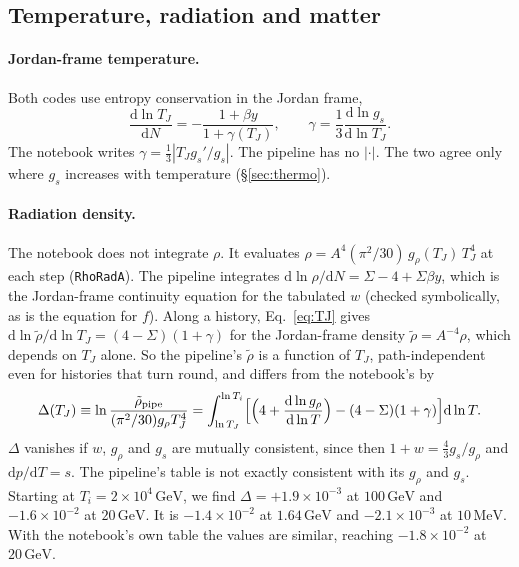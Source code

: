 \documentclass[11pt,a4paper]{article}
\newcommand{\TJ}{T_{J}}
\newcommand{\GeV}{\,\mathrm{GeV}}
\newcommand{\code}[1]{\texttt{#1}}
\begin{document}
\subsection{Temperature, radiation and matter}

\paragraph{Jordan-frame temperature.} Both codes use entropy conservation in the Jordan frame,
\begin{equation}
  \frac{\mathrm{d}\ln\TJ}{\mathrm{d}N} = -\frac{1+\beta y}{1 + \gamma(\TJ)},
  \qquad
  \gamma = \frac{1}{3}\frac{\mathrm{d}\ln g_s}{\mathrm{d}\ln\TJ}.
  \label{eq:TJ}
\end{equation}
The notebook writes $\gamma = \tfrac13|\TJ g_s'/g_s|$. The pipeline has no $|\cdot|$. The two
agree only where $g_s$ increases with temperature (\S\ref{sec:thermo}).

\paragraph{Radiation density.} The notebook does not integrate $\rho$. It evaluates
$\rho = A^4(\pi^2/30)\,g_\rho(\TJ)\,\TJ^4$ at each step (\code{RhoRadA}). The pipeline
integrates $\mathrm{d}\ln\rho/\mathrm{d}N = \Sigma - 4 + \Sigma\beta y$, which is the
Jordan-frame continuity equation for the tabulated $w$ (checked symbolically, as is the
equation for $f$). Along a history, Eq.~\eqref{eq:TJ} gives $\mathrm{d}\ln\tilde\rho/\mathrm{d}\ln\TJ
= (4-\Sigma)(1+\gamma)$ for the Jordan-frame density $\tilde\rho = A^{-4}\rho$, which depends
on $\TJ$ alone. So the pipeline's $\tilde\rho$ is a function of $\TJ$, path-independent even
for histories that turn round, and differs from the notebook's by
\begin{equation}
  \Delta(\TJ) \equiv \ln\frac{\tilde\rho_{\rm pipe}}{(\pi^2/30)g_\rho\TJ^4}
  = \int_{\ln\TJ}^{\ln T_i}\Bigl[\Bigl(4 + \frac{\mathrm{d}\ln g_\rho}{\mathrm{d}\ln T}\Bigr)
     - (4-\Sigma)(1+\gamma)\Bigr]\mathrm{d}\ln T.
  \label{eq:delta}
\end{equation}
$\Delta$ vanishes if $w$, $g_\rho$ and $g_s$ are mutually consistent, since then $1 + w =
\tfrac43 g_s/g_\rho$ and $\mathrm{d}p/\mathrm{d}T = s$. The pipeline's table is not exactly
consistent with its $g_\rho$ and $g_s$. Starting at $T_i = 2\times10^4\GeV$, we find
$\Delta = +1.9\times10^{-3}$ at $100\GeV$ and $-1.6\times10^{-2}$ at $20\GeV$. It is
$-1.4\times10^{-2}$ at $1.64\GeV$ and $-2.1\times10^{-3}$ at $10\,\mathrm{MeV}$. With the
notebook's own table the values are similar, reaching $-1.8\times10^{-2}$ at $20\GeV$.
\end{document}
